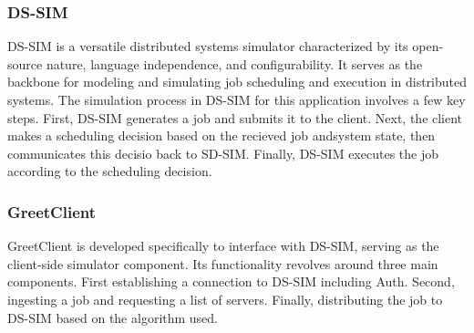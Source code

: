 
\subsubsection{DS-SIM}
DS-SIM is a versatile distributed systems simulator characterized by its open-source nature, language independence, and configurability. It serves as the backbone for modeling and simulating job scheduling and execution in distributed systems. The simulation process in DS-SIM for this application involves a few key steps. First, DS-SIM generates a job and submits it to the client. Next, the client makes a scheduling decision based on the recieved job andsystem state, then communicates this decisio back to SD-SIM. Finally, DS-SIM executes the job according to the scheduling decision.

\subsubsection{GreetClient}
GreetClient is developed specifically to interface with DS-SIM, serving as the client-side simulator component. Its functionality revolves around three main components. First establishing a connection to DS-SIM including Auth. Second, ingesting a job and requesting a list of servers. Finally, distributing the job to DS-SIM based on the algorithm used.

